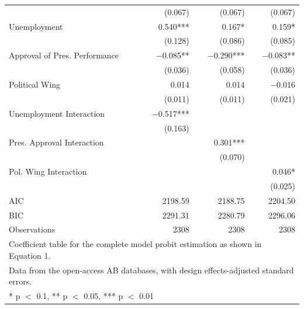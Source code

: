 \documentclass[floatsintext,man]{apa7}\usepackage[]{graphicx}\usepackage[]{color}
\begin{document}
\begin{longtable}[t]{lrrr}
 & (\num{0.067}) & (\num{0.067}) & (\num{0.067})\\
Unemployment & \num{0.540}*** & \num{0.167}* & \num{0.159}*\\
 & (\num{0.128}) & (\num{0.086}) & (\num{0.085})\\
Approval of Pres. Performance & \num{-0.085}** & \num{-0.290}*** & \num{-0.083}**\\
 & (\num{0.036}) & (\num{0.058}) & (\num{0.036})\\
Political Wing & \num{0.014} & \num{0.014} & \num{-0.016}\\
 & (\num{0.011}) & (\num{0.011}) & (\num{0.021})\\
Unemployment Interaction & \num{-0.517}*** &  & \\
 & (\num{0.163}) &  & \\
Pres. Approval Interaction &  & \num{0.301}*** & \\
 &  & (\num{0.070}) & \\
Pol. Wing Interaction &  &  & \num{0.046}*\\
 &  &  & (\num{0.025})\\
\midrule
AIC & \num{2198.59} & \num{2188.75} & \num{2204.50}\\
BIC & \num{2291.31} & \num{2280.79} & \num{2296.06}\\
Observations & 2308 & 2308 & 2308\\
\bottomrule
\multicolumn{4}{l}{\rule{0pt}{1em}Coefficient table for the complete model probit estimation as shown in Equation 1.}\\
\multicolumn{4}{l}{\rule{0pt}{1em}Data from the open-access AB databases, with design effects-adjusted standard errors.}\\
\multicolumn{4}{l}{\rule{0pt}{1em}* p $<$ 0.1, ** p $<$ 0.05, *** p $<$ 0.01}\\
\end{longtable}
\end{document}
